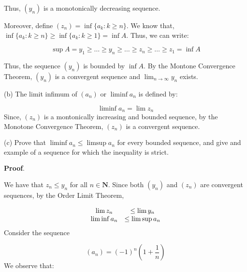 \documentclass[10pt]{article}
\begin{document}
Thus, $\displaystyle ( y_{n})$ is a monotonically decreasing sequence. 



Moreover, define $\displaystyle ( z_{n}) =\inf\{a_{k} :k\geq n\}$. We know that, $\displaystyle \inf\{a_{k} :k\geq n\} \geq \inf\{a_{k} :k\geq 1\} =\inf A$. Thus, we can write:


\begin{equation*}
\sup A=y_{1} \geq \dotsc \geq y_{n} \geq \dotsc \geq z_{n} \geq \dotsc \geq z_{1} =\inf A
\end{equation*}


Thus, the sequence $\displaystyle ( y_{n})$ is bounded by $\displaystyle \inf A$. By the Montone Convergence Theorem, $\displaystyle ( y_{n})$ is a convergent sequence and $\displaystyle \lim _{n\rightarrow \infty } y_{n}$ exists.



(b) The limit infimum of $\displaystyle ( a_{n})$ or $\displaystyle \liminf a_{n}$ is defined by:


\begin{equation*}
\liminf a_{n} =\lim z_{n}
\end{equation*}
Since, $\displaystyle ( z_{n})$ is a montonically increasing and bounded sequence, by the Monotone Convergence Theorem, $\displaystyle ( z_{n})$ is a convergent sequence. 



(c) Prove that $\displaystyle \liminf a_{n} \leq \limsup a_{n}$ for every bounded sequence, and give and example of a sequence for which the inequality is strict.



\textbf{Proof}.



We have that $\displaystyle z_{n} \leq y_{n}$ for all $\displaystyle n\in \mathbf{N}$. Since both $\displaystyle ( y_{n})$ and $\displaystyle ( z_{n})$ are convergent sequences, by the Order Limit Theorem,


\begin{equation*}
\begin{array}{ c c }
\lim z_{n} & \leq \lim y_{n}\\
\liminf a_{n} & \leq \limsup a_{n}
\end{array}
\end{equation*}
Consider the sequence 




\begin{equation*}
( a_{n}) =( -1)^{n}\left( 1+\frac{1}{n}\right)
\end{equation*}
We observe that:
\end{document}
